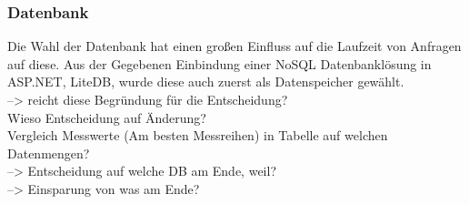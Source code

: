 \subsubsection{Datenbank} \label{sec:Experimente}
Die Wahl der Datenbank hat einen großen Einfluss auf die Laufzeit von Anfragen auf diese.
Aus der Gegebenen Einbindung einer NoSQL Datenbanklösung in ASP.NET, LiteDB, wurde diese auch zuerst als Datenspeicher gewählt.
\\
--> reicht diese Begründung für die Entscheidung? \\

Wieso Entscheidung auf Änderung? \\

Vergleich Messwerte (Am besten Messreihen) in Tabelle auf welchen Datenmengen? \\

--> Entscheidung auf welche DB am Ende, weil? \\
--> Einsparung von was am Ende? \\